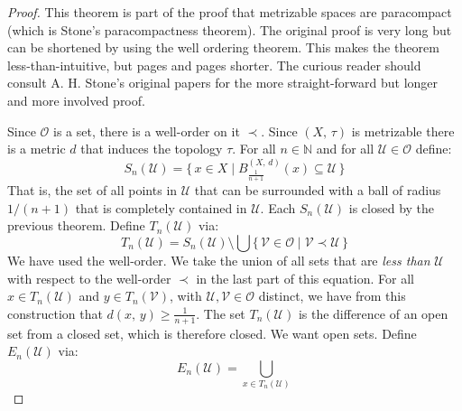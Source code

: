 \documentclass{article}
\theoremstyle{plain}
\theoremstyle{normal}
\begin{document}
        \begin{proof}
            This theorem is part of the proof that metrizable spaces are
            paracompact (which is Stone's paracompactness theorem). The
            original proof is very long but can be shortened by using the
            well ordering theorem. This makes the theorem less-than-intuitive,
            but pages and pages shorter. The curious reader should consult
            A. H. Stone's original papers for the more straight-forward but
            longer and more involved proof.
            \par\hfill\par
            Since $\mathcal{O}$ is a set, there is a well-order on it
            $\prec$. Since $(X,\,\tau)$ is metrizable there is a metric
            $d$ that induces the topology $\tau$. For all $n\in\mathbb{N}$
            and for all $\mathcal{U}\in\mathcal{O}$ define:
            \begin{equation}
                S_{n}(\mathcal{U})=
                \{\,x\in{X}\;|\;
                    {B}_{\frac{1}{n+1}}^{(X,\,d)}(x)\subseteq\mathcal{U}\,\}
            \end{equation}
            That is, the set of all points in $\mathcal{U}$ that can be
            surrounded with a ball of radius $1/(n+1)$ that is completely
            contained in $\mathcal{U}$. Each $S_{n}(\mathcal{U})$ is closed by
            the previous theorem. Define $T_{n}(\mathcal{U})$ via:
            \begin{equation}
                T_{n}(\mathcal{U})=
                S_{n}(\mathcal{U})\setminus\bigcup
                    \big\{\,\mathcal{V}\in\mathcal{O}\;|\;
                        \mathcal{V}\prec\mathcal{U}\,\big\}
            \end{equation}
            We have used the well-order. We take the union of all sets that are
            \textit{less than} $\mathcal{U}$ with respect to the well-order
            $\prec$ in the last part of this equation. For all
            $x\in{T}_{n}(\mathcal{U})$ and $y\in{T}_{n}(\mathcal{V})$, with
            $\mathcal{U},\mathcal{V}\in\mathcal{O}$ distinct, we have from this
            construction that $d(x,\,y)\geq\frac{1}{n+1}$. The set
            $T_{n}(\mathcal{U})$ is the difference of an open set from a
            closed set, which is therefore closed.
            We want open sets. Define $E_{n}(\mathcal{U})$ via:
            \begin{equation}
                E_{n}(\mathcal{U})=
                \bigcup_{x\in{T}_{n}(\mathcal{U})}

\end{equation}
\end{proof}
\end{document}
